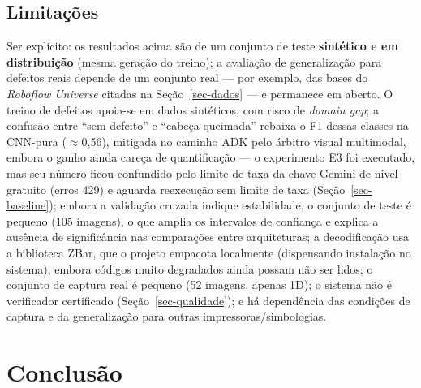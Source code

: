 \documentclass[
	article,			%
	11pt,				%
	oneside,			%
	a4paper,			%
	english,			%
	brazilian,			%
	sumario=tradicional
	]{abntex2}
\begin{document}
\subsection{Limitações}

Ser explícito: os resultados acima são de um conjunto de teste \textbf{sintético e em
distribuição} (mesma geração do treino); a avaliação de generalização para defeitos
reais depende de um conjunto real --- por exemplo, das bases do \textit{Roboflow
Universe} citadas na Seção~\ref{sec-dados} --- e permanece em aberto. O treino de
defeitos apoia-se em dados sintéticos, com risco de \textit{domain gap}; a confusão
entre ``sem defeito'' e ``cabeça queimada'' rebaixa o F1 dessas classes na CNN-pura
($\approx$0,56), mitigada no caminho ADK pelo árbitro visual multimodal, embora o
ganho ainda careça de quantificação --- o experimento E3 foi executado, mas seu número
ficou confundido pelo limite de taxa da chave Gemini de nível gratuito (erros 429) e
aguarda reexecução sem limite de taxa (Seção~\ref{sec-baseline});
embora a validação cruzada indique estabilidade, o conjunto de teste é pequeno (105
imagens), o que amplia os intervalos de confiança e explica a ausência de significância
nas comparações entre arquiteturas; a decodificação usa a biblioteca ZBar, que o
projeto empacota localmente (dispensando instalação no sistema), embora códigos muito
degradados ainda possam não ser lidos; o conjunto de captura real é pequeno (52
imagens, apenas 1D); o sistema não é verificador certificado
(Seção~\ref{sec-qualidade}); e há dependência das condições de captura e da
generalização para outras impressoras/simbologias.

\section{Conclusão}\label{sec-conclusao}
\end{document}

